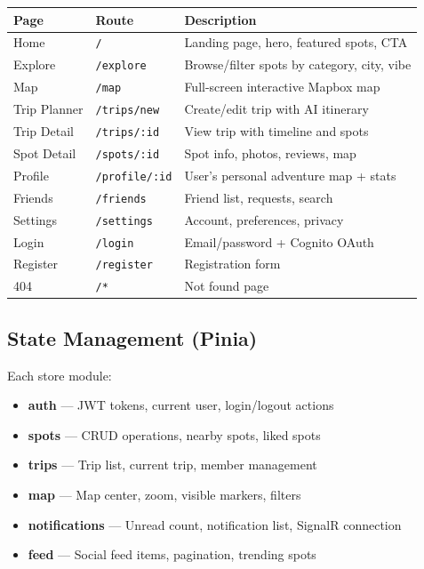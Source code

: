 \documentclass[12pt,letterpaper]{article}
\begin{document}
\begin{tabular}{|l|l|l|}
\hline
\textbf{Page} & \textbf{Route} & \textbf{Description} \\
\hline
Home & \texttt{/} & Landing page, hero, featured spots, CTA \\
Explore & \texttt{/explore} & Browse/filter spots by category, city, vibe \\
Map & \texttt{/map} & Full-screen interactive Mapbox map \\
Trip Planner & \texttt{/trips/new} & Create/edit trip with AI itinerary \\
Trip Detail & \texttt{/trips/:id} & View trip with timeline and spots \\
Spot Detail & \texttt{/spots/:id} & Spot info, photos, reviews, map \\
Profile & \texttt{/profile/:id} & User's personal adventure map + stats \\
Friends & \texttt{/friends} & Friend list, requests, search \\
Settings & \texttt{/settings} & Account, preferences, privacy \\
Login & \texttt{/login} & Email/password + Cognito OAuth \\
Register & \texttt{/register} & Registration form \\
404 & \texttt{/*} & Not found page \\
\hline
\end{tabular}

\subsection{State Management (Pinia)}
Each store module:
\begin{itemize}
  \item \textbf{auth} --- JWT tokens, current user, login/logout actions
  \item \textbf{spots} --- CRUD operations, nearby spots, liked spots
  \item \textbf{trips} --- Trip list, current trip, member management
  \item \textbf{map} --- Map center, zoom, visible markers, filters
  \item \textbf{notifications} --- Unread count, notification list, SignalR connection
  \item \textbf{feed} --- Social feed items, pagination, trending spots
\end{itemize}
\end{document}
